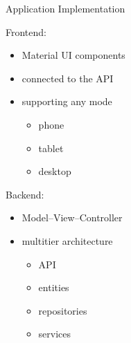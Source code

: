 \documentclass[]{beamer}
\begin{document}
    \begin{frame}{Application Implementation}
       \setlength{\columnsep}{-10mm}
      \begin{adjustwidth}{7mm}{-8mm}
        \begin{multicols}{2}
          Frontend:
          \begin{itemize}
            \item Material UI components
            \item connected to the API
            \item supporting any mode
            \begin{itemize}
              \item phone
              \item tablet
              \item desktop
            \end{itemize}
          \end{itemize}

          \columnbreak

          Backend:
          \begin{itemize}
            \item Model--View--Controller
            \item multitier architecture
            \begin{itemize}
              \item API
              \item entities
              \item repositories
              \item services
            \end{itemize}
          \end{itemize}
        \end{multicols}
      \end{adjustwidth}
    \end{frame}
\end{document}
